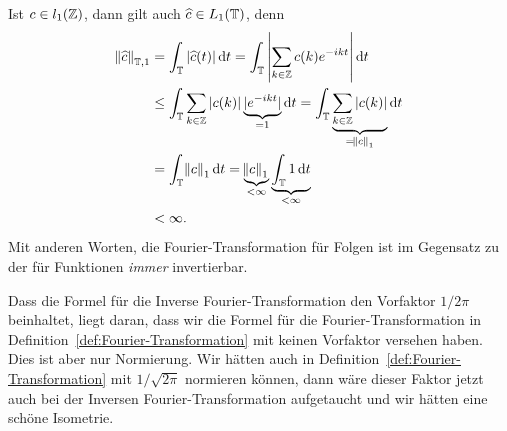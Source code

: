 \begin{remark}
\begin{description}
		Ist $ c \in l_{1}(\mathbb{Z}) $, dann gilt auch $ \widehat{c} \in L_{1}(\mathbb{T}) $, denn
		\begin{align*}
  		 \norm{\widehat{c}}_{\T, 1}
		&= \int_{\T} |\widehat{c}(t)| \dif t
		 = \int_{\T} \left| \sum_{k \in \Z} c(k) e^{-ikt} \right| \dif t \\
		&\leq \int_{\T} \sum_{k \in \Z} |c(k)| \underbrace{|e^{-ikt}|}_{= 1} \dif t
		 = \int_{\T} \underbrace{\sum_{k \in \Z} |c(k)|}_{= \norm{c}_{1}} \dif t \\
		&= \int_{\T} \norm{c}_{1} \dif t
		 = \underbrace{\norm{c}_{1}}_{< \infty} \underbrace{\int_{\T} 1 \dif t}_{< \infty} \\
		&< \infty.
		\end{align*}
		Mit anderen Worten, die Fourier-Transformation für Folgen ist im Gegensatz zu der für Funktionen
		\emph{immer} invertierbar.
		
		Dass die Formel für die Inverse Fourier-Transformation den Vorfaktor $ 1 / 2\pi $ beinhaltet,
		liegt daran, dass wir die Formel für die Fourier-Transformation in 
		Definition~\ref{def:Fourier-Transformation} mit keinen Vorfaktor versehen haben. Dies ist aber 
		nur Normierung. Wir hätten auch in Definition~\ref{def:Fourier-Transformation} mit
		$ 1 / \sqrt{2\pi} $ normieren können, dann wäre dieser Faktor jetzt auch bei der Inversen
		Fourier-Transformation aufgetaucht und wir hätten eine schöne Isometrie.
	\end{description}
\end{remark}

